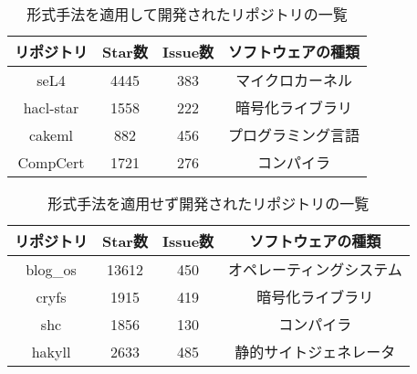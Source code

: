 \begin{table}[p]
	\centering
	\caption{形式手法を適用して開発されたリポジトリの一覧}
	\label{tab:repository_formal}
	\begin{tabular}{cccc} %
		\hline
		リポジトリ & Star数 & Issue数 & ソフトウェアの種類   \\\hline
		seL4       & 4445   & 383     & マイクロカーネル   \\
		hacl-star  & 1558   & 222     & 暗号化ライブラリ   \\
		cakeml     & 882    & 456     & プログラミング言語 \\
		CompCert   & 1721   & 276     & コンパイラ         \\\hline
	\end{tabular}
\end{table}

\begin{table}[p]
	\centering
	\caption{形式手法を適用せず開発されたリポジトリの一覧}
	\label{tab:repository_common}
	\begin{tabular}{cccc} %
		\hline
		リポジトリ & Star数 & Issue数 & ソフトウェアの種類         \\\hline
		blog\_os   & 13612  & 450     & オペレーティングシステム \\
		cryfs      & 1915   & 419     & 暗号化ライブラリ         \\
		shc        & 1856   & 130     & コンパイラ               \\
		hakyll     & 2633   & 485     & 静的サイトジェネレータ   \\\hline
	\end{tabular}
\end{table}



